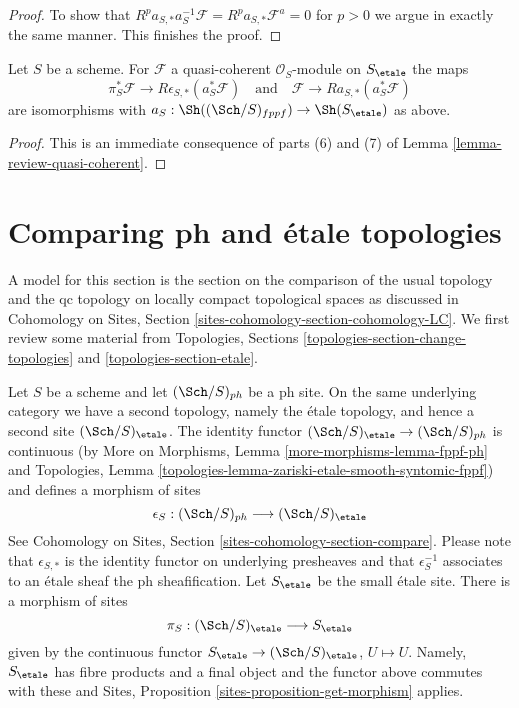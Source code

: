 \begin{proof}
\medskip\noindent
To show that $R^pa_{S, *}a_S^{-1}\mathcal{F} = R^pa_{S, *}\mathcal{F}^a = 0$
for $p > 0$ we argue in exactly the same manner. This finishes the proof.
\end{proof}

\begin{lemma}
\label{lemma-cohomological-descent-etale-fppf-modules}
Let $S$ be a scheme. For $\mathcal{F}$ a quasi-coherent
$\mathcal{O}_S$-module on $S_\etale$ the maps
$$
\pi_S^*\mathcal{F} \longrightarrow R\epsilon_{S, *}(a_S^*\mathcal{F})
\quad\text{and}\quad
\mathcal{F} \longrightarrow Ra_{S, *}(a_S^*\mathcal{F})
$$
are isomorphisms with
$a_S : \Sh((\Sch/S)_{fppf}) \to \Sh(S_\etale)$ as above.
\end{lemma}

\begin{proof}
This is an immediate consequence of
parts (6) and (7) of
Lemma \ref{lemma-review-quasi-coherent}.
\end{proof}







\section{Comparing ph and \'etale topologies}
\label{section-ph-etale}

\noindent
A model for this section is the section on the comparison of the
usual topology and the qc topology on locally compact topological
spaces as discussed in Cohomology on Sites, Section
\ref{sites-cohomology-section-cohomology-LC}.
We first review some material from
Topologies, Sections
\ref{topologies-section-change-topologies} and
\ref{topologies-section-etale}.

\medskip\noindent
Let $S$ be a scheme and let $(\Sch/S)_{ph}$ be a ph site.
On the same underlying category we have a second topology,
namely the \'etale topology, and hence a second site
$(\Sch/S)_\etale$. The identity functor
$(\Sch/S)_\etale \to (\Sch/S)_{ph}$ is continuous
(by More on Morphisms, Lemma \ref{more-morphisms-lemma-fppf-ph}
and Topologies, Lemma
\ref{topologies-lemma-zariski-etale-smooth-syntomic-fppf})
and defines a morphism of sites
$$
\epsilon_S : (\Sch/S)_{ph} \longrightarrow (\Sch/S)_\etale
$$
See Cohomology on Sites, Section \ref{sites-cohomology-section-compare}.
Please note that $\epsilon_{S, *}$ is the identity functor on underlying
presheaves and that $\epsilon_S^{-1}$ associates to an \'etale sheaf the
ph sheafification.
Let $S_\etale$ be the small \'etale site.
There is a morphism of sites
$$
\pi_S : (\Sch/S)_\etale \longrightarrow S_\etale
$$
given by the continuous functor
$S_\etale \to (\Sch/S)_\etale$, $U \mapsto U$.
Namely, $S_\etale$ has fibre products and a final object and the
functor above commutes with these and
Sites, Proposition \ref{sites-proposition-get-morphism} applies.

